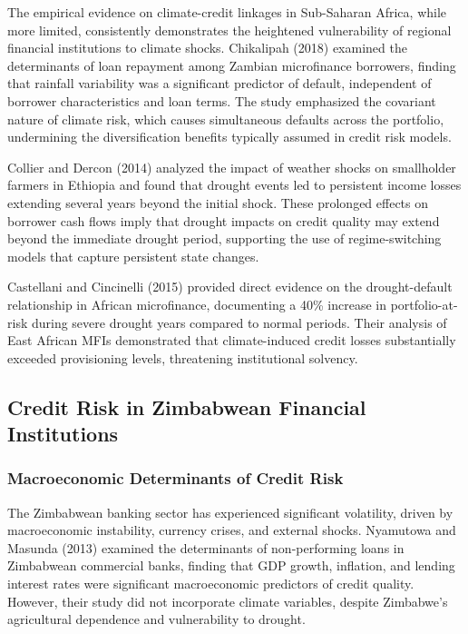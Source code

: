 \documentclass[12pt,a4paper]{article}
\begin{document}
The empirical evidence on climate-credit linkages in Sub-Saharan Africa, while more limited, consistently demonstrates the heightened vulnerability of regional financial institutions to climate shocks. Chikalipah (2018) examined the determinants of loan repayment among Zambian microfinance borrowers, finding that rainfall variability was a significant predictor of default, independent of borrower characteristics and loan terms. The study emphasized the covariant nature of climate risk, which causes simultaneous defaults across the portfolio, undermining the diversification benefits typically assumed in credit risk models.

Collier and Dercon (2014) analyzed the impact of weather shocks on smallholder farmers in Ethiopia and found that drought events led to persistent income losses extending several years beyond the initial shock. These prolonged effects on borrower cash flows imply that drought impacts on credit quality may extend beyond the immediate drought period, supporting the use of regime-switching models that capture persistent state changes.

Castellani and Cincinelli (2015) provided direct evidence on the drought-default relationship in African microfinance, documenting a 40\% increase in portfolio-at-risk during severe drought years compared to normal periods. Their analysis of East African MFIs demonstrated that climate-induced credit losses substantially exceeded provisioning levels, threatening institutional solvency.

\subsection{Credit Risk in Zimbabwean Financial Institutions}

\subsubsection{Macroeconomic Determinants of Credit Risk}

The Zimbabwean banking sector has experienced significant volatility, driven by macroeconomic instability, currency crises, and external shocks. Nyamutowa and Masunda (2013) examined the determinants of non-performing loans in Zimbabwean commercial banks, finding that GDP growth, inflation, and lending interest rates were significant macroeconomic predictors of credit quality. However, their study did not incorporate climate variables, despite Zimbabwe's agricultural dependence and vulnerability to drought.
\end{document}
